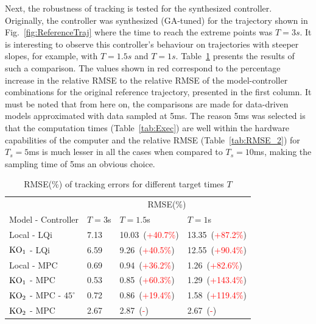Next, the robustness of tracking is tested for the synthesized controller. Originally, the controller was synthesized (GA-tuned) for the trajectory shown in Fig.~\ref{fig:ReferenceTraj} where the time to reach the extreme points was $T = 3s$. It is interesting to observe this controller's behaviour on trajectories with steeper slopes, for example, with $T = 1.5s$ and $T = 1s$. Table~\ref{tab:RMSE_diffslopes} presents the results of such a comparison. The values shown in red correspond to the percentage increase in the relative RMSE to the relative RMSE of the model-controller combinations for the original reference trajectory, presented in the first column. It must be noted that from here on, the comparisons are made for data-driven models approximated with data sampled at 5ms. The reason 5ms was selected is that the computation times (Table~\ref{tab:Exec}) are well within the hardware capabilities of the computer and the relative RMSE (Table~\ref{tab:RMSE_2}) for $T_s = 5$ms is much lesser in all the cases when compared to $T_s = 10$ms, making the sampling time of 5ms an obvious choice.
\begin{table}[H]
    \centering
    \begin{tabular}{llll}
         \toprule
                                            & \multicolumn{3}{c}{RMSE(\%)}\\
        \cmidrule{2-4}
         Model - Controller                  & $T = 3$s & $T = 1.5$s & $T = 1$s \\
         \midrule
         Local - LQi                         & 7.13       & 10.03~(\textcolor{red}{+40.7\%})      & 13.35~(\textcolor{red}{+87.2\%})\\
         $\textup{KO}_1$ - LQi               & 6.59       & 9.26~(\textcolor{red}{+40.5\%})       & 12.55~(\textcolor{red}{+90.4\%})\\
         Local - MPC                         & 0.69       & 0.94~(\textcolor{red}{+36.2\%})       & 1.26~(\textcolor{red}{+82.6\%})\\
         $\textup{KO}_1$ - MPC               & 0.53       & 0.85~(\textcolor{red}{+60.3\%})       & 1.29~(\textcolor{red}{+143.4\%})\\
         $\textup{KO}_2$ - MPC - $45^\circ$  & 0.72       & 0.86~(\textcolor{red}{+19.4\%})       & 1.58~(\textcolor{red}{+119.4\%})\\
         $\textup{KO}_2$ - MPC               & 2.67       & 2.87~(\textcolor{red}{-})       & 2.67~(\textcolor{red}{-})\\
         \bottomrule
    \end{tabular}
    \caption{RMSE(\%) of tracking errors for different target times $T$}
    \label{tab:RMSE_diffslopes}
\end{table}
